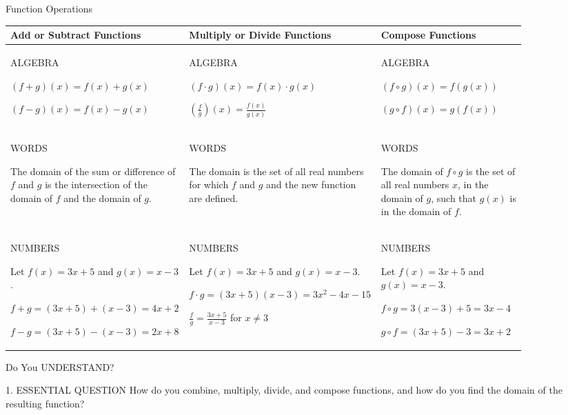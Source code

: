 \documentclass{article}
\newenvironment{concept-summary}{}{}    %
\newcommand{\answer}[1]{}               %
\begin{document}
\begin{concept-summary}
Function Operations

\begin{tabular}{p{0.29\linewidth}p{0.29\linewidth}p{0.29\linewidth}}
\toprule
Add or Subtract Functions & Multiply or Divide Functions & Compose Functions \\
\midrule
ALGEBRA

\((f+g)(x)=f(x)+g(x)\)

\((f-g)(x)=f(x)-g(x)\)
&
ALGEBRA

\((f\cdot g)(x)=f(x)\cdot g(x)\)

\(\left(\frac{f}{g}\right)(x)=\frac{f(x)}{g(x)}\)
&
ALGEBRA

\((f\circ g)(x)=f(g(x))\)

\((g\circ f)(x)=g(f(x))\)
\\
\midrule
WORDS

The domain of the sum or difference of \(f\) and \(g\) is the intersection of the domain of \(f\) and the domain of \(g\).
&
WORDS

The domain is the set of all real numbers for which \(f\) and \(g\) and the new function are defined.
&
WORDS

The domain of \(f\circ g\) is the set of all real numbers \(x\), in the domain of \(g\), such that \(g(x)\) is in the domain of \(f\).
\\
\midrule
NUMBERS

Let \(f(x)=3x+5\) and \(g(x)=x-3\).

\(f+g=(3x+5)+(x-3)=4x+2\)

\(f-g=(3x+5)-(x-3)=2x+8\)
&
NUMBERS

Let \(f(x)=3x+5\) and \(g(x)=x-3\).

\(f\cdot g=(3x+5)(x-3)=3x^2-4x-15\)

\(\frac{f}{g}=\frac{3x+5}{x-3}\) for \(x\ne 3\)
&
NUMBERS

Let \(f(x)=3x+5\) and \(g(x)=x-3\).

\(f\circ g=3(x-3)+5=3x-4\)

\(g\circ f=(3x+5)-3=3x+2\)
\\
\bottomrule
\end{tabular}

Do You UNDERSTAND?

1. ESSENTIAL QUESTION How do you combine, multiply, divide, and compose functions, and how do you find the domain of the resulting function?
\answer{To perform an arithmetic operation on a pair of functions, substitute their rules and perform the operation on them. The domain of the resulting function will be the set of all real numbers for which the original two functions and the resulting function are defined. To compose functions, apply one function to the rule of the other. The domain of the resulting function will be the set of all real numbers for which both the composite function and the inner function, the first function applied, are defined.}


\end{concept-summary}
\end{document}
